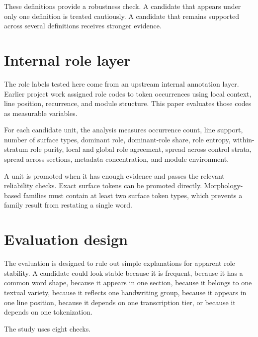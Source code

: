 \documentclass[11pt]{article}
\begin{document}
\begin{table}[H]
\centering
\caption{Role unit definitions}
\label{tabmorph}
\resizebox{\linewidth}{!}{}
\end{table}

These definitions provide a robustness check. A candidate that appears under only one definition is treated cautiously. A candidate that remains supported across several definitions receives stronger evidence.

\section{Internal role layer}

The role labels tested here come from an upstream internal annotation layer. Earlier project work assigned role codes to token occurrences using local context, line position, recurrence, and module structure. This paper evaluates those codes as measurable variables.

For each candidate unit, the analysis measures occurrence count, line support, number of surface types, dominant role, dominant-role share, role entropy, within-stratum role purity, local and global role agreement, spread across control strata, spread across sections, metadata concentration, and module environment.

A unit is promoted when it has enough evidence and passes the relevant reliability checks. Exact surface tokens can be promoted directly. Morphology-based families must contain at least two surface token types, which prevents a family result from restating a single word.

\section{Evaluation design}

The evaluation is designed to rule out simple explanations for apparent role stability. A candidate could look stable because it is frequent, because it has a common word shape, because it appears in one section, because it belongs to one textual variety, because it reflects one handwriting group, because it appears in one line position, because it depends on one transcription tier, or because it depends on one tokenization.

The study uses eight checks.
\end{document}
